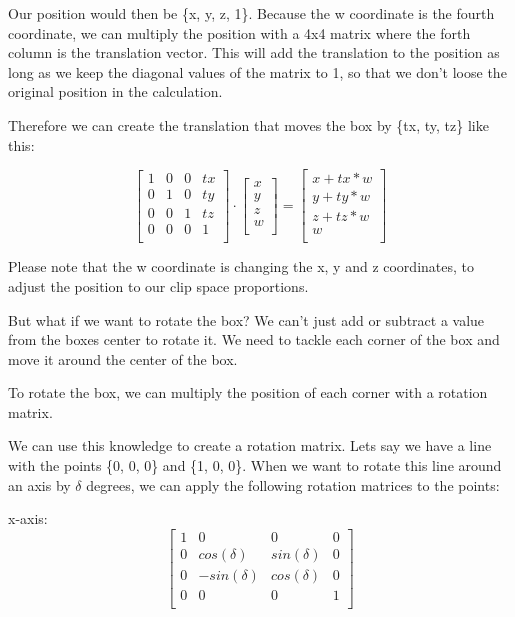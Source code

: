 \documentclass[12pt]{report} \usepackage{preamble}
\begin{document}
Our position would then be \{x, y, z, 1\}. Because the w coordinate is the
fourth coordinate, we can multiply the position with a 4x4 matrix where
the forth column is the translation vector. This will add the translation
to the position as long as we keep the diagonal values of the matrix to 1,
so that we don't loose the original position in the calculation.

Therefore we can create the translation that moves the box by \{tx, ty, tz\}
like this:

\[
	\begin{bmatrix}
		1 & 0 & 0 & tx \\
		0 & 1 & 0 & ty \\
		0 & 0 & 1 & tz \\
		0 & 0 & 0 & 1  \\
	\end{bmatrix}
	\cdot
	\begin{bmatrix}
		x \\
		y \\
		z \\
		w \\
	\end{bmatrix}
	=
	\begin{bmatrix}
		x + tx*w \\
		y + ty*w \\
		z + tz*w \\
		w        \\
	\end{bmatrix}
\]

Please note that the w coordinate is changing the x, y and z coordinates,
to adjust the position to our clip space proportions.

But what if we want to rotate the box? We can't just add or
subtract a value from the boxes center to rotate it. We need to tackle each
corner of the box and move it around the center of the box.

To rotate the box, we can multiply the position of each corner with a
rotation matrix.

We can use this knowledge to create a rotation matrix. Lets say we have a line with
the points \{0, 0, 0\} and \{1, 0, 0\}.
When we want to rotate this line around an axis by \(\delta\) degrees, we can apply
the following rotation matrices to the points:

x-axis: \[
	\begin{bmatrix}
		1 & 0            & 0           & 0 \\
		0 & cos(\delta)  & sin(\delta) & 0 \\
		0 & -sin(\delta) & cos(\delta) & 0 \\
		0 & 0            & 0           & 1 \\
	\end{bmatrix}
\]
\end{document}
